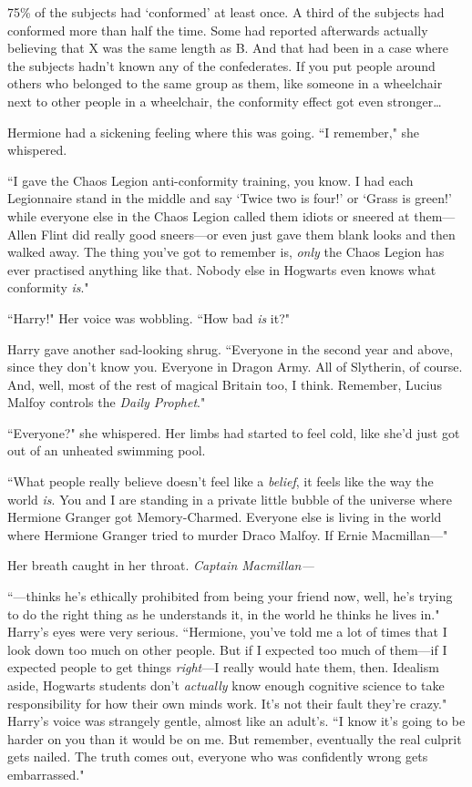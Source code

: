 75\% of the subjects had `conformed' at least once. A third of the subjects had conformed more than half the time. Some had reported afterwards actually believing that X was the same length as B\@. And that had been in a case where the subjects hadn't known any of the confederates. If you put people around others who belonged to the same group as them, like someone in a wheelchair next to other people in a wheelchair, the conformity effect got even stronger{\ldots}

Hermione had a sickening feeling where this was going. ``I remember," she whispered.

``I gave the Chaos Legion anti-conformity training, you know. I had each Legionnaire stand in the middle and say `Twice two is four!' or `Grass is green!' while everyone else in the Chaos Legion called them idiots or sneered at them—Allen Flint did really good sneers—or even just gave them blank looks and then walked away. The thing you've got to remember is, \emph{only} the Chaos Legion has ever practised anything like that. Nobody else in Hogwarts even knows what conformity \emph{is}."

``Harry!" Her voice was wobbling. ``How bad \emph{is} it?"

Harry gave another sad-looking shrug. ``Everyone in the second year and above, since they don't know you. Everyone in Dragon Army. All of Slytherin, of course. And, well, most of the rest of magical Britain too, I think. Remember, Lucius Malfoy controls the \emph{Daily Prophet}."

``Everyone?" she whispered. Her limbs had started to feel cold, like she'd just got out of an unheated swimming pool.

``What people really believe doesn't feel like a \emph{belief}, it feels like the way the world \emph{is}. You and I are standing in a private little bubble of the universe where Hermione Granger got Memory-Charmed. Everyone else is living in the world where Hermione Granger tried to murder Draco Malfoy. If Ernie Macmillan—"

Her breath caught in her throat. \emph{Captain Macmillan—}

``—thinks he's ethically prohibited from being your friend now, well, he's trying to do the right thing as he understands it, in the world he thinks he lives in." Harry's eyes were very serious. ``Hermione, you've told me a lot of times that I look down too much on other people. But if I expected too much of them—if I expected people to get things \emph{right}—I really would hate them, then. Idealism aside, Hogwarts students don't \emph{actually} know enough cognitive science to take responsibility for how their own minds work. It's not their fault they're crazy." Harry's voice was strangely gentle, almost like an adult's. ``I know it's going to be harder on you than it would be on me. But remember, eventually the real culprit gets nailed. The truth comes out, everyone who was confidently wrong gets embarrassed."

